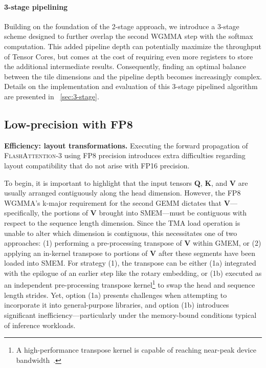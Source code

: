 \begin{enumerate}
\paragraph{3-stage pipelining} Building on the foundation of the 2-stage approach, we introduce a 3-stage scheme designed to further overlap the second WGMMA step with the softmax computation. This added pipeline depth can potentially maximize the throughput of Tensor Cores, but comes at the cost of requiring even more registers to store the additional intermediate results. Consequently, finding an optimal balance between the tile dimensions and the pipeline depth becomes increasingly complex. Details on the implementation and evaluation of this 3-stage pipelined algorithm are presented in ~\cref{sec:3-stage}.

\subsection{Low-precision with FP8}
\label{sec:algofp8}

\textbf{Efficiency: layout transformations.} Executing the forward propagation of \textsc{FlashAttention-3} using FP8 precision introduces extra difficulties regarding layout compatibility that do not arise with FP16 precision.

To begin, it is important to highlight that the input tensors $\mathbf{Q}$, $\mathbf{K}$, and $\mathbf{V}$ are usually arranged contiguously along the head dimension. However, the FP8 WGMMA’s k-major requirement for the second GEMM dictates that $\mathbf{V}$—specifically, the portions of $\mathbf{V}$ brought into SMEM—must be contiguous with respect to the sequence length dimension. Since the TMA load operation is unable to alter which dimension is contiguous, this necessitates one of two approaches: (1) performing a pre-processing transpose of $\mathbf{V}$ within GMEM, or (2) applying an in-kernel transpose to portions of $\mathbf{V}$ after these segments have been loaded into SMEM. For strategy (1), the transpose can be either (1a) integrated with the epilogue of an earlier step like the rotary embedding, or (1b) executed as an independent pre-processing transpose kernel\footnote{A high-performance transpose kernel is capable of reaching near-peak device bandwidth~\citep{colfax_cutlass_transpose_2024}.} to swap the head and sequence length strides. Yet, option (1a) presents challenges when attempting to incorporate it into general-purpose libraries, and option (1b) introduces significant inefficiency—particularly under the memory-bound conditions typical of inference workloads.


\end{enumerate}
